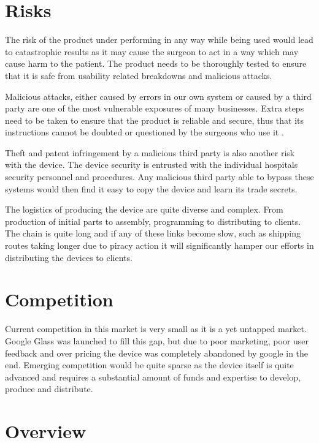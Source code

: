 \documentclass{article}
\begin{document}
\section{Risks}
The risk of the product under performing in any way while being used would lead to catastrophic results as it may cause the surgeon to act in a way which may cause harm to the patient.
The product needs to be thoroughly tested to ensure that it is safe from usability related breakdowns and malicious attacks.

Malicious attacks, either caused by errors in our own system or caused by a third party are one of the most vulnerable exposures of many businesses. Extra steps need to be taken to ensure that the product is reliable and secure, thus that its instructions cannot be doubted or questioned by the surgeons who use it .

Theft and patent infringement by a malicious third party is also another risk with the device. The device security is entrusted with the individual hospitals security personnel and procedures. Any malicious third party able to bypass these systems would then find it easy to copy the device and learn its trade secrets.

The logistics of producing the device are quite diverse and complex. From production of initial parts to assembly, programming to distributing to clients. The chain is quite long and if any of these links become slow, such as shipping routes taking longer due to piracy action it will significantly hamper our efforts in distributing the devices to clients.





\section{Competition}
Current competition in this market is very small as it is a yet untapped market. Google Glass was launched to fill this gap, but due to poor marketing, poor user feedback and over pricing the device was completely abandoned by google in the end.
Emerging competition would be quite sparse as the device itself is quite advanced and requires a substantial amount of funds and expertise to develop, produce and distribute.



\section{Overview}
\end{document}

